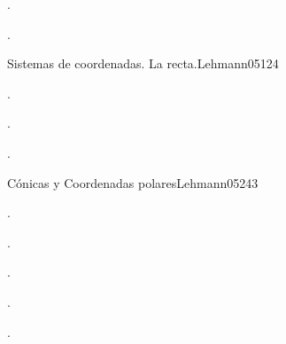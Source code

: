 \begin{syllabus}


\begin{justification}

\end{justification}

\begin{goals}
\item .
\item .
\end{goals}

\begin{outcomes}
\end{outcomes}

\begin{competences}
    \item {}
    \item {}
    \item {}
    \item {}
\end{competences}

\begin{unit}{Sistemas de coordenadas. La recta.}{}{Lehmann05}{12}{4}
   \begin{topics}
      \item .
      \item .
   \end{topics}
   \begin{learningoutcomes}
      \item .
   \end{learningoutcomes}
\end{unit}

\begin{unit}{Cónicas y Coordenadas polares}{}{Lehmann05}{24}{3}
   \begin{topics}
      \item .
      \item .
   \end{topics}

   \begin{learningoutcomes}
      \item .
      \item .
      \item .
      \end{learningoutcomes}
\end{unit}


\end{syllabus}
